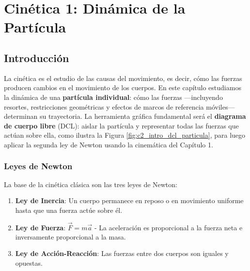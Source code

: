 
\chapter{Cinética 1: Dinámica de la Partícula}

\section*{Introducción}

La cinética es el estudio de las causas del movimiento, es decir, cómo las fuerzas producen cambios en el movimiento de los cuerpos. En este capítulo estudiamos la dinámica de una \textbf{partícula individual}: cómo las fuerzas —incluyendo resortes, restricciones geométricas y efectos de marcos de referencia móviles— determinan su trayectoria. La herramienta gráfica fundamental será el \textbf{diagrama de cuerpo libre} (DCL): aislar la partícula y representar todas las fuerzas que actúan sobre ella, como ilustra la Figura \ref{fig:c2_intro_dcl_particula}, para luego aplicar la segunda ley de Newton usando la cinemática del Capítulo 1.

\subsection*{Leyes de Newton}

La base de la cinética clásica son las tres leyes de Newton:

\begin{enumerate}
    \item \textbf{Ley de Inercia}: Un cuerpo permanece en reposo o en movimiento uniforme hasta que una fuerza actúe sobre él.
    \item \textbf{Ley de Fuerza}: $\vec{F} = m\vec{a}$ - La aceleración es proporcional a la fuerza neta e inversamente proporcional a la masa.
    \item \textbf{Ley de Acción-Reacción}: Las fuerzas entre dos cuerpos son iguales y opuestas.
\end{enumerate}

